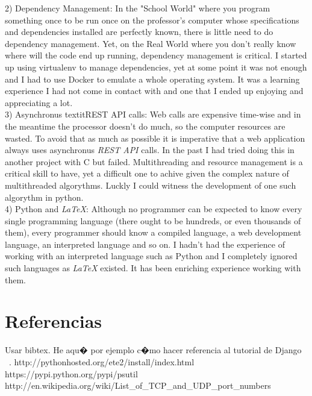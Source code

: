 \documentclass[10pt]{article}
\begin{document}
2) Dependency Management: In the "School World" where you program something once to be run once on the professor's computer whose specifications and dependencies installed are perfectly known, there is little need to do dependency management. Yet, on the Real World where you don't really know where will the code end up running, dependency management is critical. I started up using virtualenv to manage dependencies, yet at some point it was not enough and I had to use Docker to emulate a whole operating system. It was a learning experience I had not come in contact with and one that I ended up enjoying and appreciating a lot.\\

3) Asynchronus textit{REST API} calls: Web calls are expensive time-wise and in the meantime the processor doesn't do much, so the computer resources are wasted. To avoid that as much as possible it is imperative that a web application always uses asynchronus \textit{REST API} calls. In the past I had tried doing this in another project with C but failed. Multithreading and resource management is a critical skill to have, yet a difficult one to achive given the complex nature of multithreaded algorythms. Luckly I could witness the development of one such algorythm in python.\\

4) Python and \textit{LaTeX}: Although no programmer can be expected to know every single programming language (there ought to be hundreds, or even thousands of them), every programmer should know a compiled language, a web development language, an interpreted language and so on. I hadn't had the experience of working with an interpreted language such as Python and I completely ignored such languages as \textit{LaTeX} existed. It has been enriching experience working with them.\\

\section{Referencias}
 Usar bibtex. He aqu� por ejemplo c�mo hacer referencia al tutorial de Django ~\cite{DjangoTut}.
http://pythonhosted.org/ete2/install/index.html
https://pypi.python.org/pypi/psutil
http://en.wikipedia.org/wiki/List\_of\_TCP\_and\_UDP\_port\_numbers
{}

\end{document}
